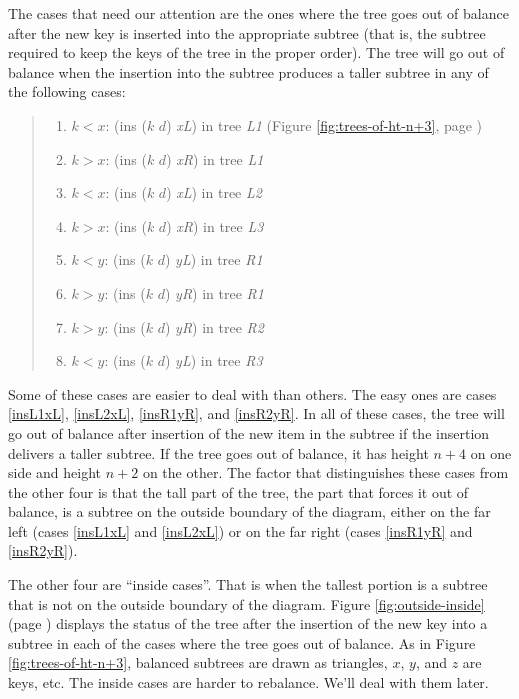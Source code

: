 The cases that need our attention are the ones where
the tree goes out of balance after the new key
is inserted into the appropriate subtree
(that is, the subtree required to keep the keys of the tree in
the proper order).
The tree will go out of balance
when the insertion into the subtree produces a taller subtree
in any of the following cases:

\label{out-of-balance-cases}
\begin{quote}
\begin{enumerate}
  \item\label{insL1xL} $k < x$: (ins ($k$ $d$) \emph{xL}) in tree \emph{L1} (Figure \ref{fig:trees-of-ht-n+3}, page \pageref{fig:trees-of-ht-n+3})
  \item\label{insL1xR} $k > x$: (ins ($k$ $d$) \emph{xR}) in tree \emph{L1}
  \item\label{insL2xL} $k < x$: (ins ($k$ $d$) \emph{xL}) in tree \emph{L2}
  \item\label{insL3xR} $k > x$: (ins ($k$ $d$) \emph{xR}) in tree \emph{L3}
  \item\label{insR1yL} $k < y$: (ins ($k$ $d$) \emph{yL}) in tree \emph{R1}
  \item\label{insR1yR} $k > y$: (ins ($k$ $d$) \emph{yR}) in tree \emph{R1}
  \item\label{insR2yR} $k > y$: (ins ($k$ $d$) \emph{yR}) in tree \emph{R2}
  \item\label{insR3yL} $k < y$: (ins ($k$ $d$) \emph{yL}) in tree \emph{R3}
\end{enumerate}
\end{quote}

Some of these cases are easier to deal with than others.
The easy ones are cases
\ref{insL1xL}, \ref{insL2xL}, \ref{insR1yR}, and \ref{insR2yR}.
In all of these cases, the tree will go out of balance after insertion
of the new item in the subtree if the insertion delivers a taller subtree.
If the tree goes out of balance, it has height $n+4$ on one side
and height $n+2$ on the other.
The factor that distinguishes these cases from the other four
is that the tall part of the tree, the part that forces it out of balance,
is a subtree on the outside boundary of the diagram,
either on the far left (cases \ref{insL1xL} and \ref{insL2xL})
or on the far right (cases \ref{insR1yR} and \ref{insR2yR}).

The other four are ``inside cases''.
That is when the tallest portion is a subtree
that is not on the outside boundary of the diagram.
Figure \ref{fig:outside-inside} (page \pageref{fig:outside-inside})
displays the status of the tree after the insertion of the new
key into a subtree in each of the cases where the tree goes out of balance.
As in Figure \ref{fig:trees-of-ht-n+3},
balanced subtrees are drawn as triangles, $x$, $y$, and $z$ are keys, etc.
The inside cases are harder to rebalance. We'll deal with them later.

